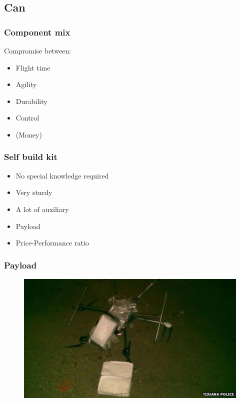 \subsection{Can}


\begin{frame}
\frametitle{Component mix}
  Compromise between:
  \begin{itemize}
    \item Flight time
    \item Agility
    \item Durability
    \item Control
	\item (Money)
		
  \end{itemize}
\end{frame}



\begin{frame}
\frametitle{Self build kit}

  \begin{itemize}
    \item No special knowledge required    
	\item Very sturdy
	\item A lot of auxiliary
	\item Payload    
	\item Price-Performance ratio
  \end{itemize}
  
\end{frame}



\begin{frame}
\frametitle{Payload}

  \begin{figure}
  \includegraphics[scale=0.65]{pic/03_our-copter/drug.jpg}
  \end{figure}
  
\end{frame}



